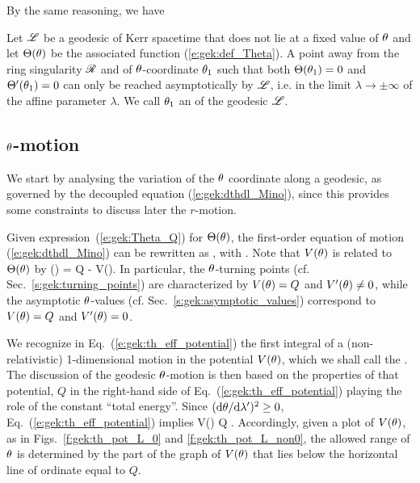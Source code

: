 By the same reasoning, we have
\begin{greybox}
Let $\mathscr{L}$ be a geodesic of Kerr spacetime that does not lie at a fixed value of $\theta$ and let
$\Theta(\theta)$ be the associated function
(\ref{e:gek:def_Theta}).
A point away from the ring singularity $\mathscr{R}$ and of $\theta$-coordinate $\theta_1$
such that both $\Theta(\theta_1) = 0$ and $\Theta'(\theta_1) = 0$
can only be reached asymptotically by $\mathscr{L}$, i.e. in the limit
$\lambda\to \pm\infty$ of the affine parameter
$\lambda$. We call $\theta_1$ an
 of the geodesic $\mathscr{L}$.
\end{greybox}



\subsection{$\theta$-motion} \label{s:gek:th_motion}

We start by analysing the variation of the $\theta$ coordinate along a geodesic,
as governed by the decoupled equation
(\ref{e:gek:dthdl_Mino}), since this provides some constraints
to discuss later the $r$-motion.

Given expression~(\ref{e:gek:Theta_Q}) for $\Theta(\theta)$,
the first-order equation of motion (\ref{e:gek:dthdl_Mino}) can be rewritten as
\be \label{e:gek:th_eff_potential}
    ,
\ee
with
\be \label{e:gek:def_V_th}
  .
\ee
Note that $V(\theta)$ is related to $\Theta(\theta)$ by
\be
    \Theta(\th) = Q - V(\th).
\ee
In particular, the $\theta$-turning points (cf. Sec.~\ref{s:gek:turning_points})
are characterized by
$V(\theta) = Q$ and $V'(\theta) \neq 0$, while the asymptotic $\theta$-values
(cf. Sec.~\ref{s:gek:asymptotic_values})
correspond to $V(\theta) = Q$ and $V'(\theta) = 0$.

We recognize in Eq.~(\ref{e:gek:th_eff_potential}) the first integral of a
(non-relativistic) 1-dimensional motion in the potential $V(\theta)$, which we
shall call the
.
The discussion of the geodesic $\theta$-motion
is then based on the properties of that potential, $Q$
in the right-hand side of Eq.~(\ref{e:gek:th_eff_potential})
playing the role of
the constant ``total energy''. Since $(\mathrm{d}\theta / \mathrm{d}\lambda')^2 \geq 0$,
Eq.~(\ref{e:gek:th_eff_potential})  implies
\be \label{e:gek:V_leq_Q}
    V(\th) \leq Q .
\ee
Accordingly, given a plot of $V(\theta)$, as in Figs.~\ref{f:gek:th_pot_L_0} and
\ref{f:gek:th_pot_L_non0}, the allowed range of $\theta$ is determined
by the part of the graph of $V(\theta)$ that lies below
the horizontal line of ordinate equal to $Q$.

